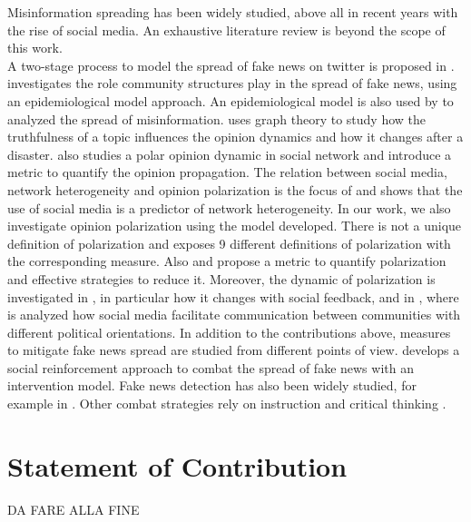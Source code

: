 Misinformation spreading has been widely studied, above all in recent years with the rise of social media. An exhaustive literature review is beyond the scope of this work.\\

A two-stage process to model the spread of fake news on twitter is proposed in \cite{Murayama2021}. \cite{Rath2019} investigates the role community structures play in the spread of fake news, using an epidemiological model approach. An epidemiological model is also used by \cite{Tambuscio2015} to analyzed the spread of misinformation. \cite{Hashimoto2021} uses graph theory to study how the truthfulness of a topic influences the opinion dynamics and how it changes after a disaster. \cite{Amelkin2017} also studies a polar opinion dynamic in social network and introduce a metric to quantify the opinion propagation. The relation between social media, network heterogeneity and opinion polarization is the focus of \cite{Lee2014a} and shows that the use of social media is a predictor of network heterogeneity. In our work, we also investigate opinion polarization using the model developed. There is not a unique definition of polarization and \cite{Bramsona2016} exposes 9 different definitions of polarization with the corresponding measure. Also \cite{Akoglu2014} and \cite{Matakos2017} propose a metric to quantify polarization and effective strategies to reduce it. Moreover, the dynamic of polarization is investigated in \cite{Banisch2019}, in particular how it changes with social feedback, and in \cite{Conover2011}, where is analyzed how social media facilitate communication between communities with different political orientations. In addition to the contributions above, measures to mitigate fake news spread are studied from different points of view. \cite{mahak2020} develops a social reinforcement approach to combat the spread of fake news with an intervention model. Fake news detection has also been widely studied, for example in \cite{Vijjali2020}\cite{improved}\cite{Zhou2020}\cite{Maryam2019}. Other combat strategies rely on instruction and critical thinking \cite{joanna2017}.


\section{Statement of Contribution}

DA FARE ALLA FINE